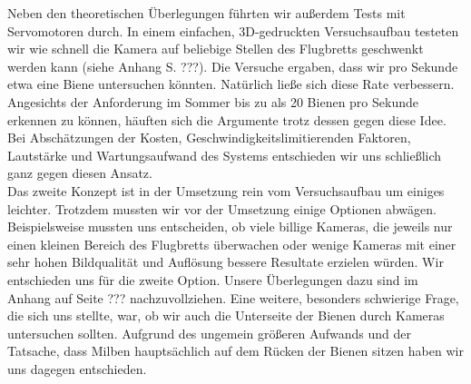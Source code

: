 \documentclass[11pt,a4paper]{article}
\begin{document}
Neben den theoretischen Überlegungen führten wir außerdem Tests mit Servomotoren durch. In einem einfachen, 3D-gedruckten Versuchsaufbau testeten wir wie schnell die Kamera auf beliebige Stellen des Flugbretts geschwenkt werden kann (siehe Anhang S. ???). Die Versuche ergaben, dass wir pro Sekunde etwa eine Biene untersuchen könnten. Natürlich ließe sich diese Rate verbessern. Angesichts der Anforderung im Sommer bis zu als 20 Bienen pro Sekunde erkennen zu können, häuften sich die Argumente trotz dessen gegen diese Idee. Bei Abschätzungen der Kosten, Geschwindigkeitslimitierenden Faktoren, Lautstärke und Wartungsaufwand des Systems entschieden wir uns schließlich ganz gegen diesen Ansatz.\\
Das zweite Konzept ist in der Umsetzung rein vom Versuchsaufbau um einiges leichter. Trotzdem mussten wir vor der Umsetzung einige Optionen abwägen. Beispielsweise mussten uns entscheiden, ob viele billige Kameras, die jeweils nur einen kleinen Bereich des Flugbretts überwachen oder wenige Kameras mit einer sehr hohen Bildqualität und Auflösung bessere Resultate erzielen würden. Wir entschieden uns für die zweite Option. Unsere Überlegungen dazu sind im Anhang auf Seite ??? nachzuvollziehen.
Eine weitere, besonders schwierige Frage, die sich uns stellte, war, ob wir auch die Unterseite der Bienen durch Kameras untersuchen sollten. Aufgrund des ungemein größeren Aufwands und der Tatsache, dass Milben hauptsächlich auf dem Rücken der Bienen sitzen haben wir uns dagegen entschieden.\\
\end{document}
